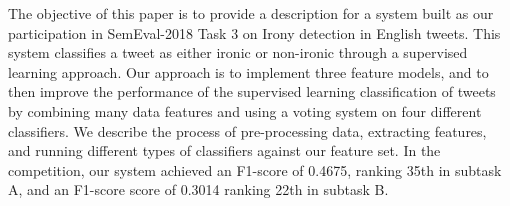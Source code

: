 The objective of this paper is to provide a description for a system built as our participation in SemEval-2018 Task 3 on Irony detection in English tweets. This system classifies a tweet as either ironic or non-ironic through a supervised learning approach. Our approach is to implement three feature models, and to then improve the performance of the supervised learning classification of tweets by combining many data features and using a voting system on four different classifiers. We describe the process of pre-processing data, extracting features, and running different types of classifiers against our feature set. In the competition, our system achieved an F1-score of 0.4675, ranking 35th in subtask A, and an F1-score score of 0.3014 ranking 22th in subtask B.
